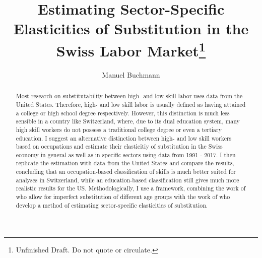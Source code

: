 \documentclass[]{article}
\title{Estimating Sector-Specific Elasticities of Substitution in the
  Swiss Labor Market\footnote{Unfinished Draft. Do not quote or circulate.}}
\author{Manuel Buchmann}
\begin{document}
\maketitle

\begin{abstract}
  Most research on substitutability between high- and low skill labor
  uses data from the United States. Therefore, high- and low skill
  labor is usually defined as having attained a college or high school
  degree respectively. However, this distinction is much less sensible
  in a country like Switzerland, where, due to its dual education
  system, many high skill workers do not possess a traditional college
  degree or even a tertiary education. I suggest an alternative
  distinction between high- and low skill workers based on occupations
  and estimate their elasticitiy of substitution in the Swiss economy
  in general as well as in specific sectors using data from 1991 -
  2017. I then replicate the estimation with data from the United
  States and compare the results, concluding that an occupation-based
  classification of skills is much better suited for analyses in
  Switzerland, while an education-based classification still gives
  much more realistic results for the US. Methodologically, I use a
  \cite{Katz.1992} framework, combining the work of \cite{Card.2001}
  who allow for imperfect substitution of different age groups with
  the work of \cite{Blankenau.2011} who develop a method of estimating
  sector-specific elasticities of substitution.
\end{abstract}

\newpage
\end{document}
